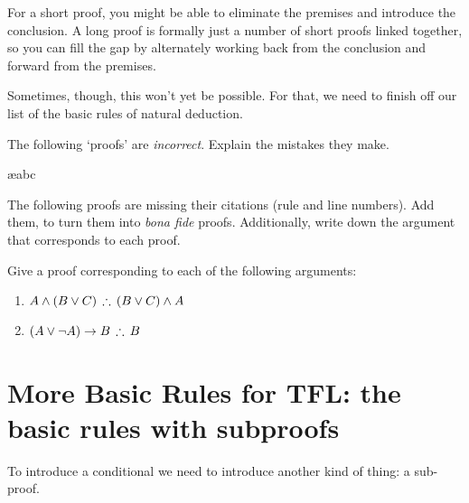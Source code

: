 For a short proof, you might be able to eliminate the premises and introduce the conclusion. A long proof is formally just a number of short proofs linked together, so you can fill the gap by alternately working back from the conclusion and forward from the premises.

Sometimes, though, this won't yet be possible. For that, we need to finish off our list of the basic rules of natural deduction.



\begin{practiceproblems}

\problempart
The following  `proofs' are \emph{incorrect}. Explain the mistakes they make.

\begin{pf}
\ae{abc}
\end{pf}

\problempart
The following proofs are missing their citations (rule and line numbers). Add them, to turn them into \emph{bona fide} proofs. Additionally, write down the argument that corresponds to each proof.

\begin{pf}
\end{pf}

\solutions
\problempart
\label{pr.solvedTFLproofs}
Give a proof corresponding to each of the following arguments:
\begin{enumerate}
\item $A\eand (B\eor C)\,\therefore\,(B\eor C)\eand A$
\item $(A\eor\enot A)\eif B\,\therefore\, B$
\end{enumerate}


\end{practiceproblems}


\chapter{More Basic Rules for TFL: the basic rules with subproofs}

To introduce a conditional we need to introduce another kind of thing: a sub-proof.

